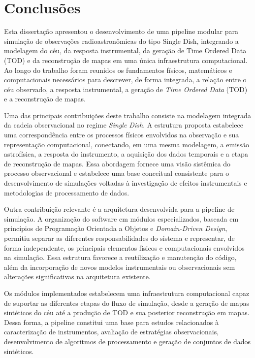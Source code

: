 
\chapter{Conclusões}

Esta dissertação apresentou o desenvolvimento de uma pipeline modular para simulação de observações radioastronômicas do tipo Single Dish, integrando a modelagem do céu, da resposta instrumental, da geração de Time Ordered Data (TOD) e da reconstrução de mapas em uma única infraestrutura computacional. Ao longo do trabalho foram reunidos os fundamentos físicos, matemáticos e computacionais necessários para descrever, de forma integrada, a relação entre o céu observado, a resposta instrumental, a geração de \textit{Time Ordered Data} (TOD) e a reconstrução de mapas.

Uma das principais contribuições deste trabalho consiste na modelagem integrada da cadeia observacional no regime \textit{Single Dish}. A estrutura proposta estabelece uma correspondência entre os processos físicos envolvidos na observação e sua representação computacional, conectando, em uma mesma modelagem, a emissão astrofísica, a resposta do instrumento, a aquisição dos dados temporais e a etapa de reconstrução de mapas. Essa abordagem fornece uma visão sistêmica do processo observacional e estabelece uma base conceitual consistente para o desenvolvimento de simulações voltadas à investigação de efeitos instrumentais e metodologias de processamento de dados.

Outra contribuição relevante é a arquitetura desenvolvida para a pipeline de simulação. A organização do software em módulos especializados, baseada em princípios de Programação Orientada a Objetos e \textit{Domain-Driven Design}, permitiu separar as diferentes responsabilidades do sistema e representar, de forma independente, os principais elementos físicos e computacionais envolvidos na simulação. Essa estrutura favorece a reutilização e manutenção do código, além da incorporação de novos modelos instrumentais ou observacionais sem alterações significativas na arquitetura existente.

Os módulos implementados estabelecem uma infraestrutura computacional capaz de suportar as diferentes etapas do fluxo de simulação, desde a geração de mapas sintéticos do céu até a produção de TOD e sua posterior reconstrução em mapas. Dessa forma, a pipeline constitui uma base para estudos relacionados à caracterização de instrumentos, avaliação de estratégias observacionais, desenvolvimento de algoritmos de processamento e geração de conjuntos de dados sintéticos.

